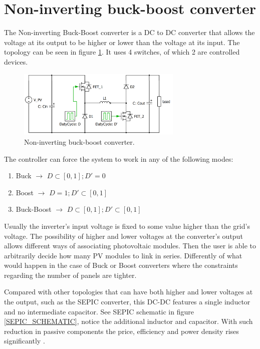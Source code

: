 
\section{Non-inverting buck-boost converter\label{N_INV_BB}}
		
The Non-inverting Buck-Boost converter is a DC to DC converter that allows the voltage at its output to be higher or lower than the voltage at its input. The topology can be seen in figure \ref{N_INV_BB_SCHEMATIC}. It uses 4 switches, of which 2 are controlled devices. 
		

\begin{figure}[htbp]
	\begin{center}
	\includegraphics[width=0.7\textwidth]{../Pictures/2_d_H_B_BB}
	\caption{Non-inverting buck-boost converter.}
	\label{N_INV_BB_SCHEMATIC}
	\end{center}	
\end{figure}

		
The controller can force the system to work in any of the following modes:

\begin{enumerate}
	\item Buck $\rightarrow$ $ D \subset [0,1];	 D' = 0 $
	\item Boost $\rightarrow$ $ D = 1;	 D' \subset [0,1] $
	\item Buck-Boost $\rightarrow$ $ D \subset [0,1]; D' \subset [0,1] $
\end{enumerate}
		
Usually the inverter's input voltage is fixed to some value higher than the grid's voltage. The possibility of higher and lower voltages at the converter's output allows different ways of associating photovoltaic modules. Then the user is able to arbitrarily decide how many PV modules to link in series. Differently of what would happen in the case of Buck or Boost converters where the constraints regarding the number of panels are tighter.
		
Compared with other topologies that can have both higher and lower voltages at the output, such as the SEPIC converter, this DC-DC features a single inductor and no intermediate capacitor. See SEPIC schematic in figure \ref{SEPIC_SCHEMATIC}, notice the additional inductor and capacitor. With such reduction in passive components the price, efficiency and power density rises significantly \cite{underthehood}.

